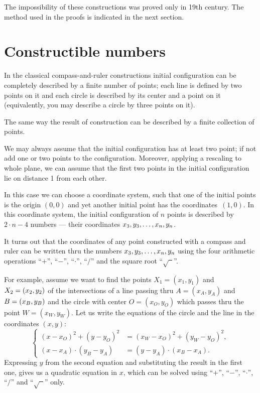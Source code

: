 \medskip

The impossibility of these constructions 
was proved only in 19th century.
The method used in the proofs is indicated in the next section.

\section*{Constructible numbers}

In the classical compass-and-ruler constructions initial configuration can be completely described by a finite number of points;
each line is defined by two points on it and each circle is described by its center and a point on it (equivalently, you may describe a circle by three points on it).

The same way the result of construction can be described by a finite collection of points.

We may always assume that the initial configuration has at least two point;
if not add one or two points to the configuration.
Moreover, applying a rescaling to whole plane, we can assume that the first two points in the initial configuration lie on distance 1 from each other.

In this case we can choose a  coordinate system, such that one of the initial points is the origin $(0,0)$ and yet another initial point has the coordinates~$(1,0)$.
In this coordinate system,
the initial configuration of $n$ points is described by 
$2\cdot n-4$ numbers --- their coordinates $x_3,y_3,\z\dots,x_n,y_n$.

\medskip

It turns out that the coordinates of any point constructed with a compass and ruler
can be written thru the numbers $x_3,y_3,\z\dots,x_n,y_n$ using the four arithmetic operations ``$+$'', ``$-$'', ``$\cdot$'', ``$/$''
and the square root ``$\sqrt{\phantom{a}}$''.

For example, assume we want to find the points $X_1=(x_1,y_1)$ and $X_2\z=(x_2,y_2)$ of the intersections of 
a line passing thru $A=(x_A,y_A)$ and $B\z=(x_B,y_B)$ and
the circle with center $O=(x_O,y_O)$ which passes thru the point $W=(x_W,y_W)$.
Let us write the equations of the circle and the line in the coordinates $(x,y)$:
$$
\left\{
\begin{aligned}
(x-x_O)^2+(y-y_O)^2&=(x_W-x_O)^2+(y_W-y_O)^2,   
\\
(x-x_A)\cdot(y_B-y_A)&=(y-y_A)\cdot(x_B-x_A).
\end{aligned}
\right.
$$
Expressing $y$ from the second equation and substituting the result in the first one, gives us a quadratic equation in $x$, 
which can be solved using ``$+$'', ``$-$'', ``$\cdot$'', ``$/$''
and  ``$\sqrt{\phantom{a}}$'' only.

